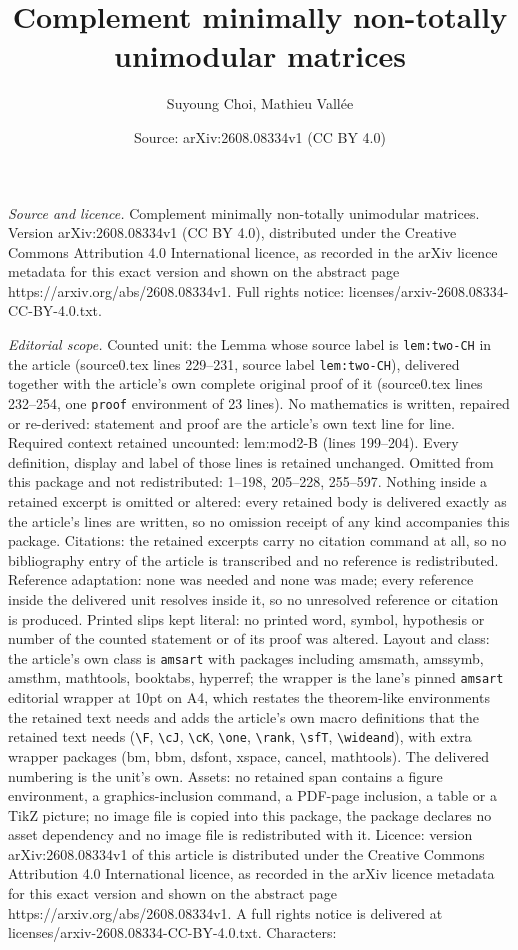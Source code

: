 \documentclass[10pt,a4paper]{amsart}
\title[Complement minimally non-totally unimodular matrices]{Complement minimally non-totally unimodular matrices}
\author{Suyoung Choi, Mathieu Vall\'ee}
\date{Source: arXiv:2608.08334v1 (CC BY 4.0)}
\begin{document}
\maketitle

\noindent\emph{Source and licence.} Complement minimally non-totally unimodular matrices. Version arXiv:2608.08334v1 (CC BY 4.0), distributed under the Creative Commons Attribution 4.0 International licence, as recorded in the arXiv licence metadata for this exact version and shown on the abstract page https://arxiv.org/abs/2608.08334v1. Full rights notice: licenses/arxiv-2608.08334-CC-BY-4.0.txt.\par\smallskip

\noindent\textit{Editorial scope.} Counted unit: the Lemma whose source label is \texttt{lem:two-CH} in the article (source0.tex lines 229--231, source label \texttt{lem:two-CH}), delivered together with the article's own complete original proof of it (source0.tex lines 232--254, one \texttt{proof} environment of 23 lines). No mathematics is written, repaired or re-derived: statement and proof are the article's own text line for line. Required context retained uncounted: lem:mod2-B (lines 199--204). Every definition, display and label of those lines is retained unchanged. Omitted from this package and not redistributed: 1--198, 205--228, 255--597. Nothing inside a retained excerpt is omitted or altered: every retained body is delivered exactly as the article's lines are written, so no omission receipt of any kind accompanies this package. Citations: the retained excerpts carry no citation command at all, so no bibliography entry of the article is transcribed and no reference is redistributed. Reference adaptation: none was needed and none was made; every reference inside the delivered unit resolves inside it, so no unresolved reference or citation is produced. Printed slips kept literal: no printed word, symbol, hypothesis or number of the counted statement or of its proof was altered. Layout and class: the article's own class is \texttt{amsart} with packages including amsmath, amssymb, amsthm, mathtools, booktabs, hyperref; the wrapper is the lane's pinned \texttt{amsart} editorial wrapper at 10pt on A4, which restates the theorem-like environments the retained text needs and adds the article's own macro definitions that the retained text needs (\texttt{\textbackslash F}, \texttt{\textbackslash cJ}, \texttt{\textbackslash cK}, \texttt{\textbackslash one}, \texttt{\textbackslash rank}, \texttt{\textbackslash sfT}, \texttt{\textbackslash wideand}), with extra wrapper packages (bm, bbm, dsfont, xspace, cancel, mathtools). The delivered numbering is the unit's own. Assets: no retained span contains a figure environment, a graphics-inclusion command, a PDF-page inclusion, a table or a TikZ picture; no image file is copied into this package, the package declares no asset dependency and no image file is redistributed with it. Licence: version arXiv:2608.08334v1 of this article is distributed under the Creative Commons Attribution 4.0 International licence, as recorded in the arXiv licence metadata for this exact version and shown on the abstract page https://arxiv.org/abs/2608.08334v1. A full rights notice is delivered at licenses/arxiv-2608.08334-CC-BY-4.0.txt. Characters: 
\end{document}

